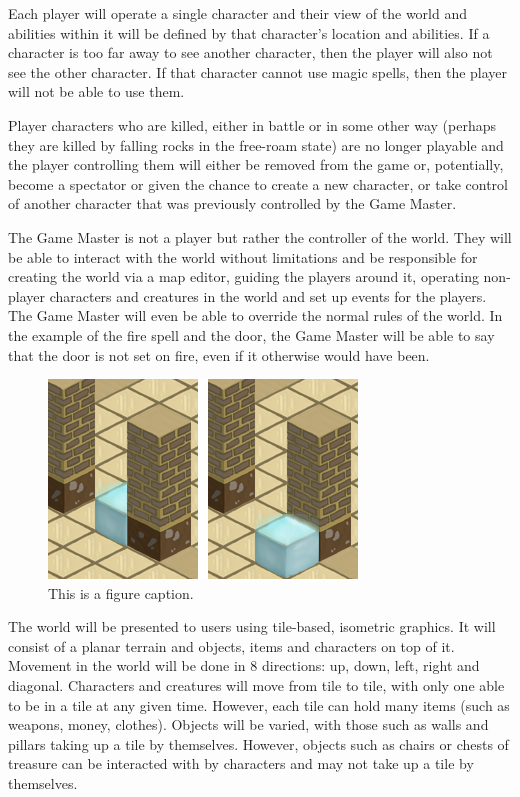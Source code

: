 \documentclass[11pt,fleqn,twoside]{article}
\begin{document}
Each player will operate a single character and their view of the world and abilities within it will be defined by that character's location and abilities. If a character is too far away to see another character, then the player will also not see the other character. If that character cannot use magic spells, then the player will not be able to use them.

Player characters who are killed, either in battle or in some other way (perhaps they are killed by falling rocks in the free-roam state) are no longer playable and the player controlling them will either be removed from the game or, potentially, become a spectator or given the chance to create a new character, or take control of another character that was previously controlled by the Game Master.

The Game Master is not a player but rather the controller of the world. They will be able to interact with the world without limitations and be responsible for creating the world via a map editor, guiding the players around it, operating non-player characters and creatures in the world and set up events for the players. The Game Master will even be able to override the normal rules of the world. In the example of the fire spell and the door, the Game Master will be able to say that the door is not set on fire, even if it otherwise would have been.

\begin{figure}
\includegraphics{figures/figure-1.png}
\caption{This is a figure caption.\label{figure_name}}
\end{figure}

The world will be presented to users using tile-based, isometric graphics. It will consist of a planar terrain and objects, items and characters on top of it. Movement in the world will be done in 8 directions: up, down, left, right and diagonal. Characters and creatures will move from tile to tile, with only one able to be in a tile at any given time. However, each tile can hold many items (such as weapons, money, clothes). Objects will be varied, with those such as walls and pillars taking up a tile by themselves. However, objects such as chairs or chests of treasure can be interacted with by characters and may not take up a tile by themselves.
\end{document}
